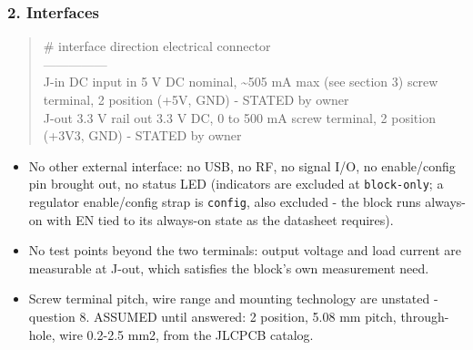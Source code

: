 \documentclass[11pt,a4paper]{article}
\begin{document}
\subsubsection*{2. Interfaces}
\begin{quote}\small\ttfamily\raggedright
\textbar{} \# \textbar{} interface \textbar{} direction \textbar{} electrical \textbar{} connector \textbar{}\\
\textbar{}---\textbar{}---\textbar{}---\textbar{}---\textbar{}---\textbar{}\\
\textbar{} J-in \textbar{} DC input \textbar{} in \textbar{} 5 V DC nominal, \textasciitilde{}505 mA max (see section 3) \textbar{} screw terminal, 2 position (+5V, GND) - STATED by owner \textbar{}\\
\textbar{} J-out \textbar{} 3.3 V rail \textbar{} out \textbar{} 3.3 V DC, 0 to 500 mA \textbar{} screw terminal, 2 position (+3V3, GND) - STATED by owner \textbar{}
\end{quote}
\begin{itemize}
\item No other external interface: no USB, no RF, no signal I/O, no enable/config
pin brought out, no status LED (indicators are excluded at \texttt{block-only}; a
regulator enable/config strap is \texttt{config}, also excluded - the block runs
always-on with EN tied to its always-on state as the datasheet requires).
\item No test points beyond the two terminals: output voltage and load current are
measurable at J-out, which satisfies the block's own measurement need.
\item Screw terminal pitch, wire range and mounting technology are unstated -
question 8. ASSUMED until answered: 2 position, 5.08 mm pitch, through-hole,
wire 0.2-2.5 mm2, from the JLCPCB catalog.
\end{itemize}
\end{document}
